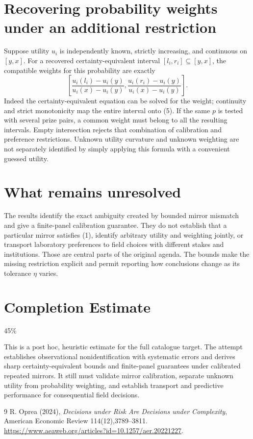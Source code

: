 \documentclass[11pt]{article}
\theoremstyle{definition}
\begin{document}
\section*{Recovering probability weights under an additional restriction}
Suppose utility $u_i$ is independently known, strictly increasing, and
continuous on $[y,x]$. For a recovered certainty-equivalent interval
$[l_i,r_i]\subseteq[y,x]$, the compatible weights for this probability are
exactly
\[
 \left[\frac{u_i(l_i)-u_i(y)}{u_i(x)-u_i(y)},
       \frac{u_i(r_i)-u_i(y)}{u_i(x)-u_i(y)}\right].        \tag{5}
\]
Indeed the certainty-equivalent equation can be solved for the weight;
continuity and strict monotonicity map the entire interval onto (5).
If the same $p$ is tested with several prize pairs, a common weight must
belong to all the resulting intervals. Empty intersection rejects that
combination of calibration and preference restrictions. Unknown utility
curvature and unknown weighting are not separately identified by simply
applying this formula with a convenient guessed utility.

\section*{What remains unresolved}
The results identify the exact ambiguity created by bounded mirror mismatch
and give a finite-panel calibration guarantee. They do not establish that
a particular mirror satisfies (1), identify arbitrary utility and weighting
jointly, or transport laboratory preferences to field choices with different
stakes and institutions. Those are central parts of the original agenda.
The bounds make the missing restriction explicit and permit reporting how
conclusions change as its tolerance $\eta$ varies.

\section{Completion Estimate}
45\%

This is a post hoc, heuristic estimate for the full catalogue target.
The attempt establishes observational nonidentification with systematic errors and derives sharp certainty-equivalent bounds and finite-panel guarantees under calibrated repeated mirrors. It still must validate mirror calibration, separate unknown utility from probability weighting, and establish transport and predictive performance for consequential field decisions.

\begin{thebibliography}{9}
 R. Oprea (2024), \emph{Decisions under Risk Are Decisions
under Complexity}, American Economic Review 114(12),3789--3811.
\url{https://www.aeaweb.org/articles?id=10.1257/aer.20221227}.
\end{thebibliography}
\end{document}
